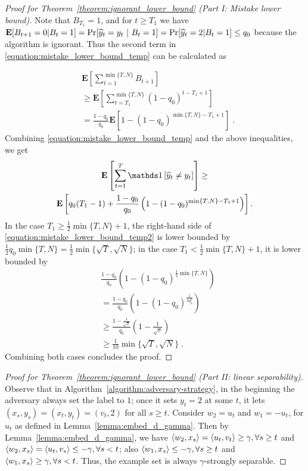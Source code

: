 \begin{proof}[Proof for Theorem~\ref{theorem:ignorant_lower_bound} (Part I: Mistake lower bound)]
Note that $B_{T_1}=1$, and for $t \ge T_1$ we have
$\operatorname*{\mathbf{E}}[B_{t+1}=0|B_t=1]=\Pr[\widehat y_t=y_t~|~B_t=1] = \Pr[\widehat y_t=2|B_t=1] \le
q_0$ because the algorithm is ignorant. Thus the second term in
\eqref{equation:mistake_lower_bound_temp} can be calculated as

\begin{align*}
& \mathbf{E}\left[\sum_{t=1}^{\min\{T,N\}}B_{t+1}\right] \\
& \ge \mathbf{E}\left[\sum_{t=T_1}^{\min\{ T,N \}} (1-q_0)^{t-T_1+1} \right] \\
& = \frac{1-q_0}{q_0}\mathbf{E}\left[1-(1-q_0)^{\min\{T,N\}-T_1+1}\right] \; .
\end{align*}
Combining \eqref{equation:mistake_lower_bound_temp} and the above inequalities, we get
\begin{multline}
\label{equation:mistake_lower_bound_temp2}
\mathbf{E} \left[\sum_{t=1}^T \indicator{\widehat y_t\neq y_t}\right] \ge
\\ \mathbf{E}\left[q_0(T_1-1)+\frac{1-q_0}{q_0}\left(1-(1-q_0)^{\min\{T,N\}-T_1+1}\right)\right].
\end{multline}
In the case $T_1\ge \frac{1}{2}\min\{T,N\}+1$, the right-hand side of
\eqref{equation:mistake_lower_bound_temp2} is lower bounded by
$\frac{1}{2}q_0\min\{T,N\}=\frac{1}{2}\min\{\sqrt{T}, \sqrt{N}\}$; in the case
$T_1< \frac{1}{2}\min\{T,N\}+1$, it is lower bounded by
\begin{align*}
& \frac{1-q_0}{q_0}\left(1-(1-q_0)^{\frac{1}{2}\min\{T,N\}}\right) \\
& = \frac{1-q_0}{q_0}\left(1-(1-q_0)^{\frac{1}{2q_0^2}}\right) \\
& \ge \frac{1-\frac{1}{\sqrt{2}}}{q_0}\left(1-\frac{1}{\sqrt{e}}\right) \\
& \ge \frac{1}{10}\min\{\sqrt{T}, \sqrt{N}\} \; .
\end{align*}
Combining both cases concludes the proof.
\end{proof}

\begin{proof}[Proof for Theorem~\ref{theorem:ignorant_lower_bound} (Part II: linear separability)]
Observe that in Algorithm~\ref{algorithm:adversary-strategy}, in the beginning
the adversary always set the label to $1$; once it sets $y_t=2$ at some $t$, it
lets $(x_s, y_s)=(x_t, y_t)=(v_t, 2)$ for all $s\ge t$. Consider $w_2=u_t$ and
$w_1=-u_t$, for $u_t$ as defined in Lemma~\ref{lemma:embed_d_gamma}. Then by
Lemma~\ref{lemma:embed_d_gamma}, we have $\left\langle w_2, x_s \right\rangle = \left\langle u_t, v_t \right\rangle \ge
\gamma, \forall s \ge t$ and $\left\langle w_2, x_s \right\rangle = \left\langle u_t, v_s \right\rangle \le - \gamma,
\forall s< t$; also $\left\langle w_1, x_s \right\rangle \le -\gamma, \forall s \ge t$ and
$\left\langle w_1, x_s \right\rangle \ge  \gamma, \forall s<t$. Thus, the example set is always
$\gamma$-strongly separable.
\end{proof}
